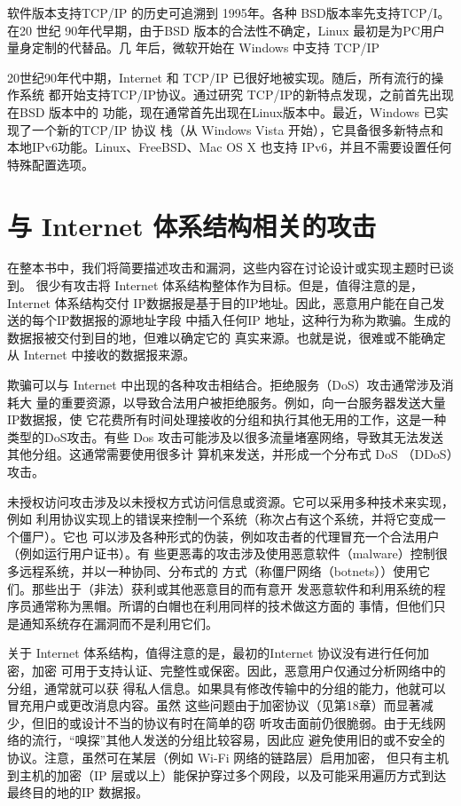 软件版本支持TCP/IP 的历史可追溯到 1995年。各种 BSD版本率先支持TCP/I。在20 世纪
90年代早期，由于BSD 版本的合法性不确定，Linux 最初是为PC用户量身定制的代替品。几
年后，微软开始在 Windows 中支持 TCP/IP

20世纪90年代中期，Internet 和 TCP/IP 已很好地被实现。随后，所有流行的操作系统
都开始支持TCP/IP协议。通过研究 TCP/IP的新特点发现，之前首先出现在BSD 版本中的
功能，现在通常首先出现在Linux版本中。最近，Windows 已实现了一个新的TCP/IP 协议
栈（从 Windows Vista 开始），它具备很多新特点和本地IPv6功能。Linux、FreeBSD、Mac
OS X 也支持 IPv6，并且不需要设置任何特殊配置选项。

\section{与 Internet 体系结构相关的攻击}
在整本书中，我们将简要描述攻击和漏洞，这些内容在讨论设计或实现主题时已谈到。
很少有攻击将 Internet 体系结构整体作为目标。但是，值得注意的是，Internet 体系结构交付
IP数据报是基于目的IP地址。因此，恶意用户能在自己发送的每个IP数据报的源地址字段
中插入任何IP 地址，这种行为称为欺骗。生成的数据报被交付到目的地，但难以确定它的
真实来源。也就是说，很难或不能确定从 Internet 中接收的数据报来源。

欺骗可以与 Internet 中出现的各种攻击相结合。拒绝服务（DoS）攻击通常涉及消耗大
量的重要资源，以导致合法用户被拒绝服务。例如，向一台服务器发送大量IP数据报，使
它花费所有时间处理接收的分组和执行其他无用的工作，这是一种类型的DoS攻击。有些
Dos 攻击可能涉及以很多流量堵塞网络，导致其无法发送其他分组。这通常需要使用很多计
算机来发送，并形成一个分布式 DoS （DDoS）攻击。

未授权访问攻击涉及以未授权方式访问信息或资源。它可以采用多种技术来实现，例如
利用协议实现上的错误来控制一个系统（称次占有这个系统，并将它变成一个僵尸）。它也
可以涉及各种形式的伪装，例如攻击者的代理冒充一个合法用户（例如运行用户证书）。有
些更恶毒的攻击涉及使用恶意软件（malware）控制很多远程系统，并以一种协同、分布式的
方式（称僵尸网络（botnets））使用它们。那些出于（非法）获利或其他恶意目的而有意开
发恶意软件和利用系统的程序员通常称为黑帽。所谓的白帽也在利用同样的技术做这方面的
事情，但他们只是通知系统存在漏洞而不是利用它们。

关于 Internet 体系结构，值得注意的是，最初的Internet 协议没有进行任何加密，加密
可用于支持认证、完整性或保密。因此，恶意用户仅通过分析网络中的分组，通常就可以获
得私人信息。如果具有修改传输中的分组的能力，他就可以冒充用户或更改消息内容。虽然
这些问题由于加密协议（见第18章）而显著减少，但旧的或设计不当的协议有时在简单的窃
听攻击面前仍很脆弱。由于无线网络的流行，“嗅探”其他人发送的分组比较容易，因此应
避免使用旧的或不安全的协议。注意，虽然可在某层（例如 Wi-Fi 网络的链路层）启用加密，
但只有主机到主机的加密（IP 层或以上）能保护穿过多个网段，以及可能采用遍历方式到达
最终目的地的IP 数据报。

